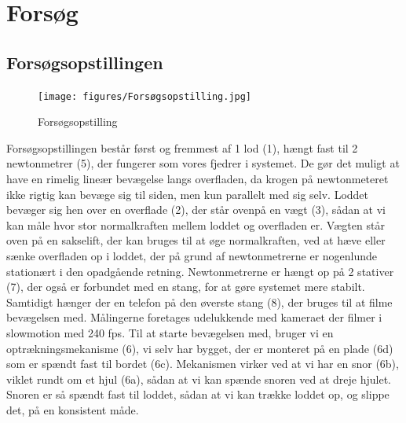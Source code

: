 \chapter{Forsøg}
\section{Forsøgsopstillingen}
\begin{figure}[htbp]
    \centering
    \texttt{[image: figures/Forsøgsopstilling.jpg]}
    \caption{Forsøgsopstilling}
    \label{fig:forsøgsopstilling}
\end{figure}
Forsøgsopstillingen består først og fremmest af 1 lod (1), hængt fast til 2 newtonmetrer (5), 
der fungerer som vores fjedrer i systemet. 
De gør det muligt at have en rimelig lineær bevægelse langs overfladen, 
da krogen på newtonmeteret ikke rigtig kan bevæge sig til siden, men kun parallelt med sig selv.
Loddet bevæger sig hen over en overflade (2), der står ovenpå en vægt (3), 
sådan at vi kan måle hvor stor normalkraften mellem loddet og overfladen er.
Vægten står oven på en sakselift, der kan bruges til at øge normalkraften, ved at hæve eller sænke overfladen op i loddet, 
der på grund af newtonmetrerne er nogenlunde stationært i den opadgående retning.
Newtonmetrerne er hængt op på 2 stativer (7), der også er forbundet med en stang, 
for at gøre systemet mere stabilt. Samtidigt hænger der en telefon på den øverste stang (8), 
der bruges til at filme bevægelsen med. Målingerne foretages udelukkende med kameraet der filmer i slowmotion med 240 fps.
Til at starte bevægelsen med, bruger vi en optrækningsmekanisme (6), vi selv har bygget, der er monteret på en plade (6d) som er spændt fast til bordet (6c).
Mekanismen virker ved at vi har en snor (6b), viklet rundt om et hjul (6a), sådan at vi kan spænde snoren ved at dreje hjulet. 
Snoren er så spændt fast til loddet, sådan at vi kan trække loddet op, og slippe det, på en konsistent måde.
